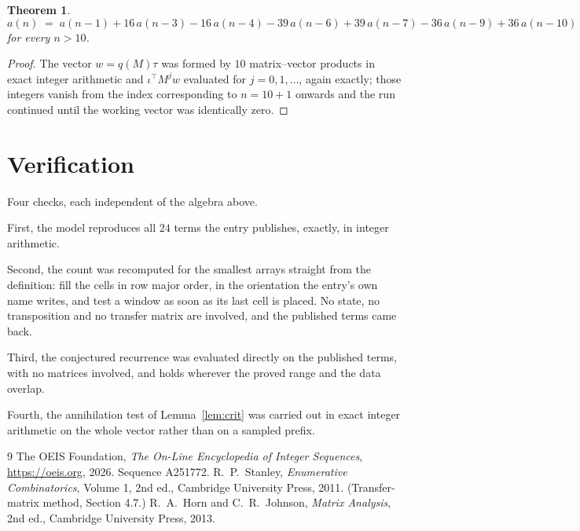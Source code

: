 \documentclass[11pt,a4paper]{article}
\theoremstyle{plain}
\newtheorem{theorem}{Theorem}
\theoremstyle{definition}
\begin{document}
\begin{theorem}
\[
a(n)\;=\;a(n-1) + 16\,a(n-3) - 16\,a(n-4) - 39\,a(n-6) + 39\,a(n-7) - 36\,a(n-9) + 36\,a(n-10)
\]
for every $n>10$.
\end{theorem}

\begin{proof}
The vector $w=q(M)\tau$ was formed by $10$ matrix--vector products in exact integer
arithmetic and $\iota^{\!\top}M^{j}w$ evaluated for $j=0,1,\dots$, again exactly; those
integers vanish from the index corresponding to $n=10+1$ onwards and the run continued
until the working vector was identically zero.
\end{proof}

\section{Verification}

Four checks, each independent of the algebra above.

First, the model reproduces all $24$ terms the entry publishes, exactly, in integer
arithmetic.

Second, the count was recomputed for the smallest arrays straight from the definition: fill the
cells in row major order, in the orientation the entry's own name writes, and test a window as
soon as its last cell is placed. No state, no transposition and no transfer matrix are
involved, and the published terms came back.

Third, the conjectured recurrence was evaluated directly on the published terms, with no
matrices involved, and holds wherever the proved range and the data overlap.

Fourth, the annihilation test of Lemma~\ref{lem:crit} was carried out in exact integer
arithmetic on the whole vector rather than on a sampled prefix.

\begin{thebibliography}{9}
 The OEIS Foundation, \emph{The On-Line Encyclopedia of Integer
Sequences}, \url{https://oeis.org}, 2026. Sequence A251772.
 R.~P.~Stanley, \emph{Enumerative Combinatorics}, Volume 1, 2nd ed.,
Cambridge University Press, 2011. (Transfer-matrix method, Section 4.7.)
 R.~A.~Horn and C.~R.~Johnson, \emph{Matrix Analysis}, 2nd ed., Cambridge
University Press, 2013.
\end{thebibliography}
\end{document}
